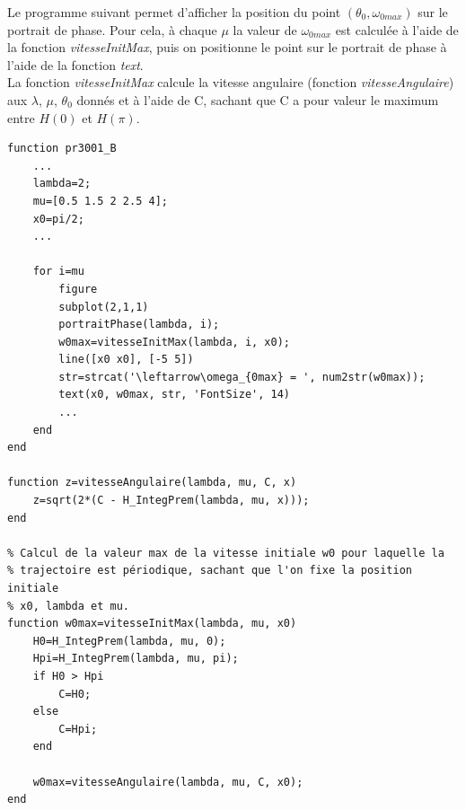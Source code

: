 \documentclass[11pt]{article}
\begin{document}
Le programme suivant permet d'afficher la position du point $(\theta_0,\omega_{0max})$ sur le portrait de phase.
Pour cela, à chaque $\mu$ la valeur de  $\omega_{0max}$ est calculée à l'aide de la fonction \emph{vitesseInitMax}, puis on positionne le point sur le portrait de phase à l'aide de la fonction \emph{text}.\\
La fonction \emph{vitesseInitMax} calcule la vitesse angulaire (fonction \emph{vitesseAngulaire}) aux $\lambda$, $\mu$, $\theta_0$ donnés et à l'aide de C, sachant que C a pour valeur le maximum entre $H(0)$ et $H(\pi)$.

\begin{lstlisting}
function pr3001_B
    ...
    lambda=2;
    mu=[0.5 1.5 2 2.5 4];
    x0=pi/2;
    ...

    for i=mu
        figure
        subplot(2,1,1)
        portraitPhase(lambda, i);
        w0max=vitesseInitMax(lambda, i, x0);
        line([x0 x0], [-5 5])
        str=strcat('\leftarrow\omega_{0max} = ', num2str(w0max));
        text(x0, w0max, str, 'FontSize', 14)
        ...
    end
end

function z=vitesseAngulaire(lambda, mu, C, x)
    z=sqrt(2*(C - H_IntegPrem(lambda, mu, x)));
end

% Calcul de la valeur max de la vitesse initiale w0 pour laquelle la
% trajectoire est périodique, sachant que l'on fixe la position initiale
% x0, lambda et mu.
function w0max=vitesseInitMax(lambda, mu, x0)
    H0=H_IntegPrem(lambda, mu, 0);
    Hpi=H_IntegPrem(lambda, mu, pi);
    if H0 > Hpi
        C=H0;
    else
        C=Hpi;
    end

    w0max=vitesseAngulaire(lambda, mu, C, x0);
end
\end{lstlisting}
\newpage
\end{document}
